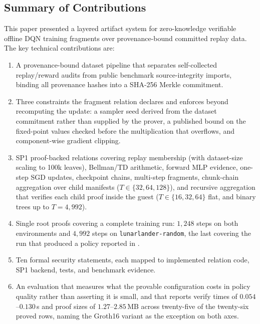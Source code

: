
\subsection{Summary of Contributions}

This paper presented a layered artifact system for zero-knowledge verifiable
offline DQN training fragments over provenance-bound committed replay data.
The key technical contributions are:

\begin{enumerate}[leftmargin=1.8em]
  \item A provenance-bound dataset pipeline that separates self-collected
  replay/reward audits from public benchmark source-integrity imports,
  binding all provenance hashes into a SHA-256 Merkle commitment.

  \item Three constraints the fragment relation declares and enforces beyond
  recomputing the update: a sampler seed derived from the dataset commitment
  rather than supplied by the prover, a published bound on the fixed-point
  values checked before the multiplication that overflows, and component-wise
  gradient clipping.

  \item SP1 proof-backed relations covering replay membership (with
  dataset-size scaling to 100k leaves), Bellman/TD arithmetic, forward MLP
  evidence, one-step SGD updates, checkpoint chains, multi-step fragments,
  chunk-chain aggregation over child manifests ($T \in \{32, 64, 128\}$), and
  recursive aggregation that verifies each child proof inside the guest
  ($T \in \{16, 32, 64\}$ flat, and binary trees up to $T = 4{,}992$).

  \item Single root proofs covering a complete training run: $1{,}248$ steps on
  both environments and $4{,}992$ steps on \texttt{lunarlander-random}, the
  last covering the run that produced a policy reported in
  .

  \item Ten formal security statements, each mapped to implemented relation
  code, SP1 backend, tests, and benchmark evidence.

  \item An evaluation that measures what the provable configuration costs in
  policy quality rather than asserting it is small, and that reports verify
  times of $0.054$--$0.130$\,s and proof sizes of $1.27$--$2.85$\,MB across
  twenty-five of the twenty-six proved rows, naming the Groth16 variant as the
  exception on both axes.
\end{enumerate}

